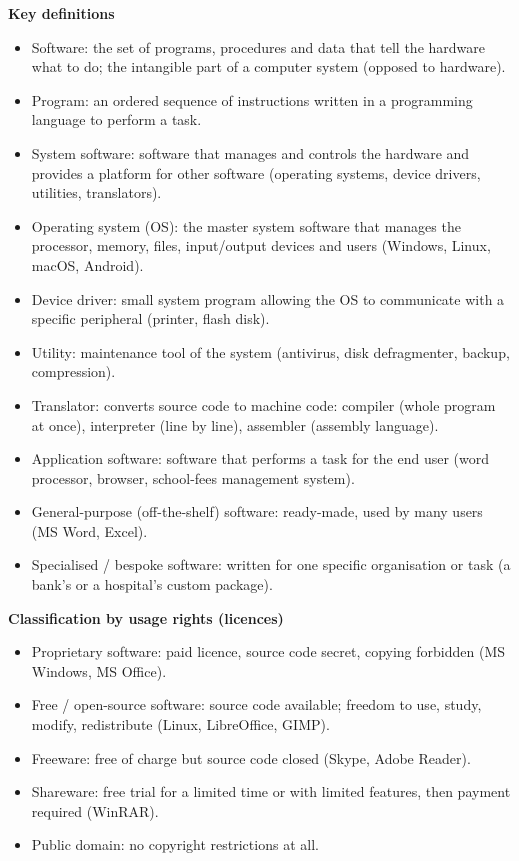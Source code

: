 \documentclass[11pt]{article}
\newcommand{\cle}[1]{{\popxbold\color{popdark}#1}}
\begin{document}
\begin{bilan}
\textbf{Key definitions}
\begin{itemize}
\item \cle{Software}: the set of programs, procedures and data that tell the hardware what to do; the intangible part of a computer system (opposed to \cle{hardware}).
\item \cle{Program}: an ordered sequence of instructions written in a programming language to perform a task.
\item \cle{System software}: software that manages and controls the hardware and provides a platform for other software (operating systems, device drivers, utilities, translators).
\item \cle{Operating system (OS)}: the master system software that manages the processor, memory, files, input/output devices and users (Windows, Linux, macOS, Android).
\item \cle{Device driver}: small system program allowing the OS to communicate with a specific peripheral (printer, flash disk).
\item \cle{Utility}: maintenance tool of the system (antivirus, disk defragmenter, backup, compression).
\item \cle{Translator}: converts source code to machine code: \cle{compiler} (whole program at once), \cle{interpreter} (line by line), \cle{assembler} (assembly language).
\item \cle{Application software}: software that performs a task for the end user (word processor, browser, school-fees management system).
\item \cle{General-purpose (off-the-shelf) software}: ready-made, used by many users (MS Word, Excel).
\item \cle{Specialised / bespoke software}: written for one specific organisation or task (a bank's or a hospital's custom package).
\end{itemize}

\textbf{Classification by usage rights (licences)}
\begin{itemize}
\item \cle{Proprietary software}: paid licence, source code secret, copying forbidden (MS Windows, MS Office).
\item \cle{Free / open-source software}: source code available; freedom to use, study, modify, redistribute (Linux, LibreOffice, GIMP).
\item \cle{Freeware}: free of charge but source code closed (Skype, Adobe Reader).
\item \cle{Shareware}: free trial for a limited time or with limited features, then payment required (WinRAR).
\item \cle{Public domain}: no copyright restrictions at all.
\end{itemize}


\end{bilan}
\end{document}
